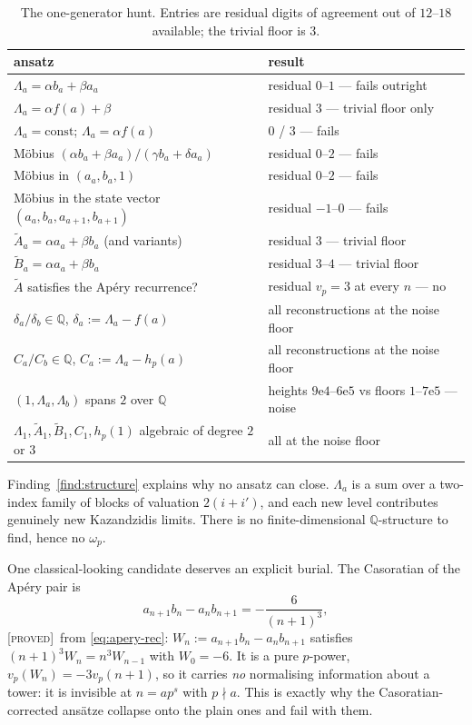 \documentclass[11pt,reqno]{article}
\newcommand{\QQ}{\mathbb{Q}}
\newcommand{\Atil}{\widetilde{A}}
\newcommand{\Btil}{\widetilde{B}}
\newcommand{\vp}{v_p}
\newcommand{\PROVED}{{\normalfont\textsc{[proved]}}}
\theoremstyle{plain}
\theoremstyle{definition}
\theoremstyle{remark}
\numberwithin{equation}{section}
\begin{document}
\begin{table}[h]
\centering\small
\caption{The one-generator hunt.  Entries are residual digits of agreement out
of $12$--$18$ available; the trivial floor is $3$.}
\label{tab:ansatz}
\begin{tabular}{@{}ll@{}}
\toprule
ansatz & result\\
\midrule
$\Lambda_a=\alpha b_a+\beta a_a$ & residual $0$--$1$ --- fails outright\\
$\Lambda_a=\alpha f(a)+\beta$ & residual $3$ --- trivial floor only\\
$\Lambda_a=\mathrm{const}$; $\Lambda_a=\alpha f(a)$ & $0$ / $3$ --- fails\\
M\"obius $(\alpha b_a+\beta a_a)/(\gamma b_a+\delta a_a)$ & residual $0$--$2$ --- fails\\
M\"obius in $(a_a,b_a,1)$ & residual $0$--$2$ --- fails\\
M\"obius in the state vector $(a_a,b_a,a_{a+1},b_{a+1})$ & residual $-1$--$0$ --- fails\\
$\Atil_a=\alpha a_a+\beta b_a$ (and variants) & residual $3$ --- trivial floor\\
$\Btil_a=\alpha a_a+\beta b_a$ & residual $3$--$4$ --- trivial floor\\
$\Atil$ satisfies the Ap\'ery recurrence? & residual $\vp=3$ at every $n$ --- no\\
$\delta_a/\delta_b\in\QQ$, $\delta_a:=\Lambda_a-f(a)$ & all reconstructions at the noise floor\\
$C_a/C_b\in\QQ$, $C_a:=\Lambda_a-h_p(a)$ & all reconstructions at the noise floor\\
$(1,\Lambda_a,\Lambda_b)$ spans $2$ over $\QQ$ & heights $9$e$4$--$6$e$5$ vs floors $1$--$7$e$5$ --- noise\\
$\Lambda_1,\Atil_1,\Btil_1,C_1,h_p(1)$ algebraic of degree $2$ or $3$ & all at the noise floor\\
\bottomrule
\end{tabular}
\end{table}

Finding~\ref{find:structure} explains why no ansatz can close.  $\Lambda_a$ is a
sum over a two-index family of blocks of valuation $2(i+i')$, and each new level
contributes genuinely new Kazandzidis limits.  There is no finite-dimensional
$\QQ$-structure to find, hence no $\omega_p$.

One classical-looking candidate deserves an explicit burial.  The Casoratian of
the Ap\'ery pair is
\begin{equation}\label{eq:casoratian}
  a_{n+1}b_n-a_nb_{n+1}=-\frac{6}{(n+1)^3},
\end{equation}
\PROVED\ from \eqref{eq:apery-rec}: $W_n:=a_{n+1}b_n-a_nb_{n+1}$ satisfies
$(n+1)^3W_n=n^3W_{n-1}$ with $W_0=-6$.  It is a pure $p$-power,
$\vp(W_n)=-3\vp(n+1)$, so it carries \emph{no} normalising information about a
tower: it is invisible at $n=ap^s$ with $p\nmid a$.  This is exactly why the
Casoratian-corrected ans\"atze collapse onto the plain ones and fail with them.
\end{document}
